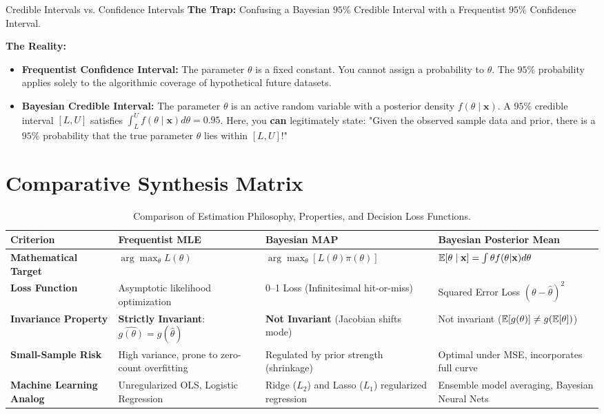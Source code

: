 \begin{trapbox}{Credible Intervals vs. Confidence Intervals}
\textbf{The Trap:} Confusing a Bayesian $95\%$ Credible Interval with a Frequentist $95\%$ Confidence Interval.

\textbf{The Reality:}
\begin{itemize}
    \item \textbf{Frequentist Confidence Interval:} The parameter $\theta$ is a fixed constant. You cannot assign a probability to $\theta$. The $95\%$ probability applies solely to the algorithmic coverage of hypothetical future datasets.
    \item \textbf{Bayesian Credible Interval:} The parameter $\theta$ is an active random variable with a posterior density $f(\theta \mid \mathbf{x})$. A $95\%$ credible interval $[L, U]$ satisfies $\int_L^U f(\theta \mid \mathbf{x}) d\theta = 0.95$. Here, you \textbf{can} legitimately state: "Given the observed sample data and prior, there is a $95\%$ probability that the true parameter $\theta$ lies within $[L, U]$!"
\end{itemize}
\end{trapbox}

\section{Comparative Synthesis Matrix}

\begin{table}[htbp]
\centering
\small
\begin{tabular}{p{3.2cm}p{3.8cm}p{3.8cm}p{3.5cm}}
\toprule
\textbf{Criterion} & \textbf{Frequentist MLE} & \textbf{Bayesian MAP} & \textbf{Bayesian Posterior Mean} \\
\midrule
\textbf{Mathematical Target} & $\arg\max_\theta L(\theta)$ & $\arg\max_\theta [L(\theta) \pi(\theta)]$ & $\mathbb{E}[\theta \mid \mathbf{x}] = \int \theta f(\theta|\mathbf{x}) d\theta$ \\
\addlinespace
\textbf{Loss Function} & Asymptotic likelihood optimization & 0--1 Loss (Infinitesimal hit-or-miss) & Squared Error Loss $(\theta - \hat{\theta})^2$ \\
\addlinespace
\textbf{Invariance Property} & \textbf{Strictly Invariant}: $\widehat{g(\theta)} = g(\hat{\theta})$ & \textbf{Not Invariant} (Jacobian shifts mode) & Not invariant ($\mathbb{E}[g(\theta)] \neq g(\mathbb{E}[\theta])$) \\
\addlinespace
\textbf{Small-Sample Risk} & High variance, prone to zero-count overfitting & Regulated by prior strength (shrinkage) & Optimal under MSE, incorporates full curve \\
\addlinespace
\textbf{Machine Learning Analog} & Unregularized OLS, Logistic Regression & Ridge ($L_2$) and Lasso ($L_1$) regularized regression & Ensemble model averaging, Bayesian Neural Nets \\
\bottomrule
\end{tabular}
\caption{Comparison of Estimation Philosophy, Properties, and Decision Loss Functions.}
\end{table}

